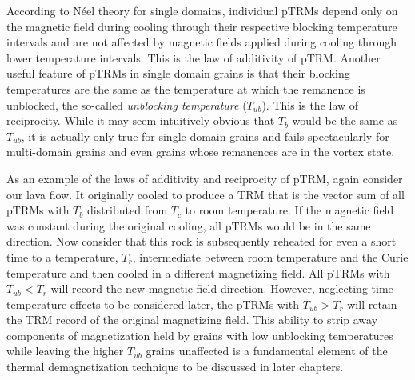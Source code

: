 According to
 N\'eel theory for single domains, individual pTRMs depend only on the magnetic field during cooling through their respective blocking temperature  intervals and
are not affected by magnetic fields applied during cooling through lower temperature intervals. This is the
law of additivity of pTRM.  Another useful feature of pTRMs in single domain grains is that their blocking temperatures are the same as the temperature at which the remanence is unblocked, the so-called
 {\it unblocking temperature}  ($T_{ub}$).   This is the 
 law of reciprocity.   While it may seem intuitively obvious that $T_b$ would be the same as $T_{ub}$, it is actually only true for single domain grains and fails spectacularly for multi-domain grains and even grains whose remanences are in the vortex state.  


As an example of the
 laws of additivity and reciprocity of pTRM, again consider our lava flow.  It originally cooled to produce a TRM that is the vector sum of all pTRMs with
$T_b$  distributed from $T_c$ to room temperature.  If the magnetic field was constant during the original cooling, all
pTRMs would be in the same direction. Now consider that this rock is subsequently reheated for even a short
time to a temperature, $T_r$,  intermediate between room temperature and the Curie temperature and then
cooled in a different magnetizing field. All pTRMs with $T_{ub} < T_r$ will record the new magnetic field direction.
However, neglecting time-temperature effects to be considered later, the pTRMs with $T_{ub} > T_r$ will retain the
TRM record of the original magnetizing field. This ability to strip away components of magnetization held by
grains with low unblocking temperatures while leaving the higher $T_{ub}$  grains unaffected is a fundamental element of the thermal
demagnetization technique to be discussed in later chapters.


